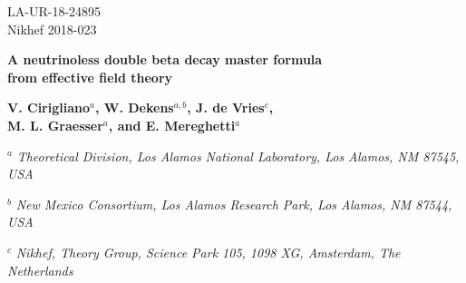 \documentclass[letterpaper,11pt]{article}
\begin{document}
\begin{titlepage}

\begin{flushright}
LA-UR-18-24895\\
Nikhef 2018-023
\end{flushright}

\vspace{2.0cm}

\begin{center}
{\LARGE  \bf 
A neutrinoless double beta decay master formula\\ 
\vspace{3mm}
from effective field theory
\vspace{3mm}
}
\vspace{2cm}

{\large \bf  V. Cirigliano$^a$, W. Dekens$^{a,b}$, J. de Vries$^{c}$, \\ \vspace{3mm}M. L. Graesser$^a$, and E. Mereghetti$^a$ } 
\vspace{0.5cm}




\vspace{0.25cm}

{\large 
$^a$ 
{\it Theoretical Division, Los Alamos National Laboratory,
Los Alamos, NM 87545, USA}}

\vspace{0.25cm}
{\large 
$^b$ 
{\it 
New Mexico Consortium, Los Alamos Research Park, Los Alamos, NM 87544, USA
}}


\vspace{0.25cm}
{\large 
$^c$ 
{\it 
Nikhef, Theory Group, Science Park 105, 1098 XG, Amsterdam, The Netherlands
}}


\end{center}

\vspace{0.2cm}

\begin{abstract}
\vspace{0.1cm}


\end{abstract}
\end{titlepage}
\end{document}
